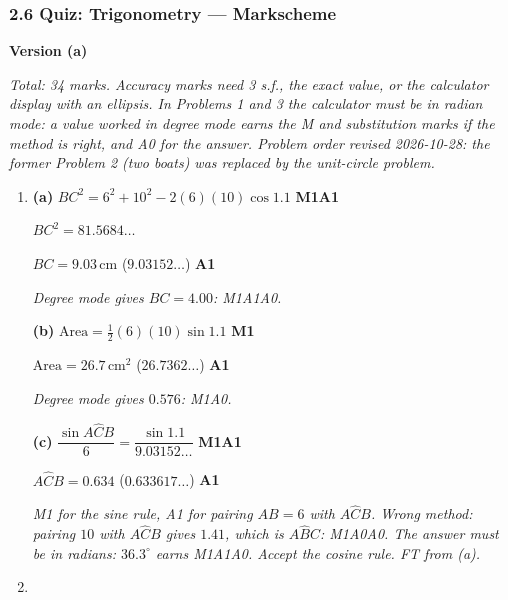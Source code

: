\documentclass[12pt, twoside]{article}
\begin{document}
\subsubsection*{2.6 Quiz: Trigonometry --- Markscheme}

\textbf{\large Version (a)}

\emph{Total: 34 marks. Accuracy marks need 3 s.f., the exact value, or the
calculator display with an ellipsis. In Problems 1 and 3 the calculator must
be in radian mode: a value worked in degree mode earns the M and
substitution marks if the method is right, and A0 for the answer. Problem
order revised 2026-10-28: the former Problem 2 (two boats) was replaced by
the unit-circle problem.}

\begin{enumerate}[itemsep=0.3cm]

\item[1.] [Maximum mark: 8]

\textbf{(a)} $BC^{2} = 6^{2} + 10^{2} - 2(6)(10)\cos 1.1$ \hfill \textbf{M1A1}

$BC^{2} = 81.5684\ldots$

$BC = 9.03\,\text{cm}$ \quad ($9.03152\ldots$) \hfill \textbf{A1}

\emph{Degree mode gives $BC = 4.00$: M1A1A0.}

\textbf{(b)} $\text{Area} = \frac{1}{2}(6)(10)\sin 1.1$ \hfill \textbf{M1}

$\text{Area} = 26.7\,\text{cm}^{2}$ \quad ($26.7362\ldots$) \hfill \textbf{A1}

\emph{Degree mode gives $0.576$: M1A0.}

\textbf{(c)} $\dfrac{\sin A\hat{C}B}{6} = \dfrac{\sin 1.1}{9.03152\ldots}$ \hfill \textbf{M1A1}

$A\hat{C}B = 0.634$ \quad ($0.633617\ldots$) \hfill \textbf{A1}

\emph{M1 for the sine rule, A1 for pairing $AB = 6$ with $A\hat{C}B$. Wrong
method: pairing $10$ with $A\hat{C}B$ gives $1.41$, which is $A\hat{B}C$:
M1A0A0. The answer must be in radians: $36.3^\circ$ earns M1A1A0. Accept
the cosine rule. FT from (a).}

\newpage

\item[2.] [Maximum mark: 9]


\end{enumerate}
\end{document}
